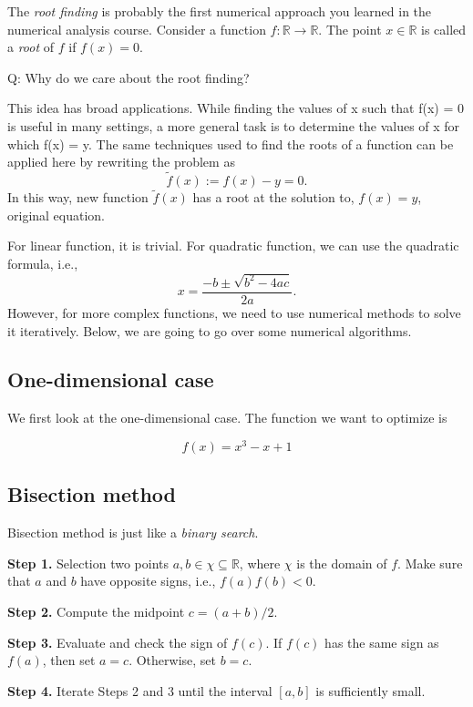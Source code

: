 \documentclass[
  letterpaper,
  DIV=11,
  numbers=noendperiod]{scrreprt}
\begin{document}
The \emph{root finding} is probably the first numerical approach you
learned in the numerical analysis course. Consider a function
\(f: \mathbb R\to \mathbb R\). The point \(x\in \mathbb R\) is called a
\emph{root} of \(f\) if \(f(x) = 0\).

Q: Why do we care about the root finding?

This idea has broad applications. While finding the values of x such
that f(x) = 0 is useful in many settings, a more general task is to
determine the values of x for which f(x) = y. The same techniques used
to find the roots of a function can be applied here by rewriting the
problem as \[
\tilde{f}(x) := f(x) - y = 0.
\] In this way, new function \(\tilde{f}(x)\) has a root at the solution
to, \(f(x)=y\), original equation.

For linear function, it is trivial. For quadratic function, we can use
the quadratic formula, i.e., \[
x = \frac{-b \pm \sqrt{b^2 - 4ac}}{2a}.
\] However, for more complex functions, we need to use numerical methods
to solve it iteratively. Below, we are going to go over some numerical
algorithms.

\subsection{One-dimensional case}\label{one-dimensional-case}

We first look at the one-dimensional case. The function we want to
optimize is

\[f(x) = x^3 - x + 1\]

\subsection{Bisection method}\label{bisection-method}

Bisection method is just like a \emph{binary search}.

\textbf{Step 1.} Selection two points
\(a,b\in \chi \subseteq \mathbb R\), where \(\chi\) is the domain of
\(f\). Make sure that \(a\) and \(b\) have opposite signs, i.e.,
\(f(a)f(b) < 0\).

\textbf{Step 2.} Compute the midpoint \(c = (a+b)/2\).

\textbf{Step 3.} Evaluate and check the sign of \(f(c)\). If \(f(c)\)
has the same sign as \(f(a)\), then set \(a=c\). Otherwise, set \(b=c\).

\textbf{Step 4.} Iterate Steps 2 and 3 until the interval \([a,b]\) is
sufficiently small.
\end{document}
